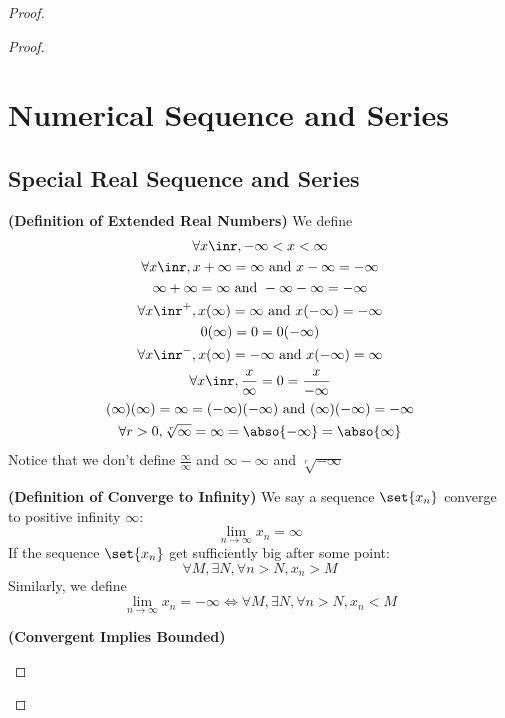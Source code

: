 \documentclass{report}
\begin{document}
\begin{proof}
\begin{proof}
\chapter{Numerical Sequence and Series}
\section{Special Real Sequence and Series}
\begin{definition}
\label{4.1.1}
\textbf{(Definition of Extended Real Numbers)} We define
\begin{gather*}
\forall x\inr, -\infty <x<\infty\\
\forall x\inr, x+\infty=\infty \text{ and }x-\infty=-\infty\\
\infty+\infty=\infty \text{ and }-\infty-\infty=-\infty\\
\forall x\inr^+, x(\infty)=\infty \text{ and }x(-\infty)=-\infty\\
0(\infty)=0=0(-\infty)\\
\forall x\inr^-, x(\infty)=-\infty\text{ and }x(-\infty)=\infty\\
\forall x\inr, \frac{x}{\infty}=0=\frac{x}{-\infty}\\
  (\infty)(\infty)=\infty=(-\infty)(-\infty)\text{ and }(\infty)(-\infty)=-\infty\\
  \forall r>0, \sqrt[r]{\infty}=\infty=\abso{-\infty}= \abso{\infty}
\end{gather*}
Notice that we don't define  $\frac{\infty}{\infty}$ and $\infty-\infty$ and $\sqrt[r]{-\infty} $
\end{definition}
\begin{definition}
\label{4.1.2}
\textbf{(Definition of Converge to Infinity)} We say a sequence $\set{x_n}$ converge to positive infinity $\infty$:
\begin{equation*}
\lim_{n\to\infty} x_n=\infty
\end{equation*}
If the sequence $\set{x_n}$ get sufficiently big after some point:
 \begin{equation*}
\forall M, \exists N, \forall n>N, x_n>M
\end{equation*}
Similarly, we define
\begin{equation*}
\lim_{n\to\infty}x_n=-\infty\iff \forall M, \exists N, \forall n>N, x_n<M
\end{equation*}
\end{definition}
\begin{theorem}
\label{4.1.3}
\textbf{(Convergent Implies Bounded)} 
\begin{equation*}

\end{equation*}
\end{theorem}
\end{proof}
\end{proof}
\end{document}
